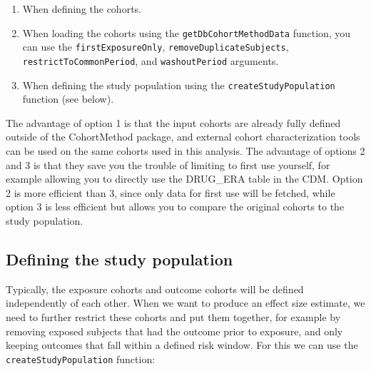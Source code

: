 \documentclass[11pt]{book}
\providecommand{\tightlist}{%
  \setlength{\itemsep}{0pt}\setlength{\parskip}{0pt}}
\theoremstyle{definition}
\theoremstyle{definition}
\theoremstyle{definition}
\theoremstyle{remark}
\begin{document}
\begin{enumerate}
\def\labelenumi{\arabic{enumi}.}
\tightlist
\item
  When defining the cohorts.
\item
  When loading the cohorts using the \texttt{getDbCohortMethodData} function, you can use the \texttt{firstExposureOnly}, \texttt{removeDuplicateSubjects}, \texttt{restrictToCommonPeriod}, and \texttt{washoutPeriod} arguments.
\item
  When defining the study population using the \texttt{createStudyPopulation} function (see below).
\end{enumerate}

The advantage of option 1 is that the input cohorts are already fully defined outside of the CohortMethod package, and external cohort characterization tools can be used on the same cohorts used in this analysis. The advantage of options 2 and 3 is that they save you the trouble of limiting to first use yourself, for example allowing you to directly use the DRUG\_ERA table in the CDM. Option 2 is more efficient than 3, since only data for first use will be fetched, while option 3 is less efficient but allows you to compare the original cohorts to the study population.

\hypertarget{defining-the-study-population}{%
\subsection{Defining the study population}\label{defining-the-study-population}}

Typically, the exposure cohorts and outcome cohorts will be defined independently of each other. When we want to produce an effect size estimate, we need to further restrict these cohorts and put them together, for example by removing exposed subjects that had the outcome prior to exposure, and only keeping outcomes that fall within a defined risk window. For this we can use the \texttt{createStudyPopulation} function:
\end{document}
